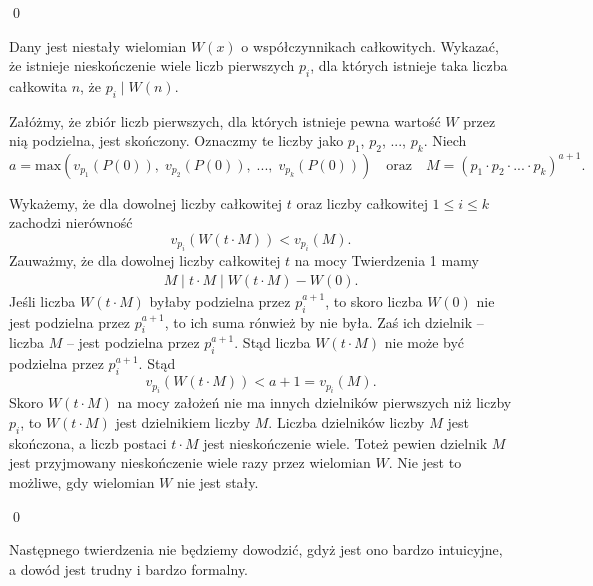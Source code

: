 \qed


\noindent
Dany jest niestały wielomian $W(x)$ o współczynnikach całkowitych. Wykazać, że istnieje nieskończenie wiele liczb pierwszych $p_i$, dla których istnieje taka liczba całkowita $n$, że $p_i \mid W(n)$.

\vspace{5px}


\noindent
Załóżmy, że zbiór liczb pierwszych, dla których istnieje pewna wartość $W$ przez nią podzielna, jest skończony. Oznaczmy te liczby jako $p_1$, $p_2$, ..., $p_k$.  Niech 
\[
	a = \text{max}(v_{p_1}(P(0)),\; v_{p_2}(P(0)),\; ...,\; v_{p_k}(P(0))) \quad \text{oraz} \quad M = (p_1 \cdot p_2 \cdot ... \cdot p_k)^{a + 1}.
\]

\vspace{10px}
\noindent
Wykażemy, że dla dowolnej liczby całkowitej $t$ oraz liczby całkowitej $1 \leqslant i \leqslant k$ zachodzi nierówność
\[
	v_{p_i}(W(t \cdot M)) < v_{p_i}(M).
\]
Zauważmy, że dla dowolnej liczby całkowitej $t$ na mocy Twierdzenia 1 mamy
\begin{align*}
	M \mid t \cdot M \mid W(t \cdot M) - W(0).
\end{align*}
Jeśli liczba $W(t \cdot M)$ byłaby podzielna przez $p_i^{a + 1}$, to skoro liczba $W(0)$ nie jest podzielna przez $p_i^{a + 1}$, to ich suma rónwież by nie była. Zaś ich dzielnik -- liczba $M$ -- jest podzielna przez $p_i^{a + 1}$. Stąd liczba $W(t \cdot M)$ nie może być podzielna przez $p_i^{a + 1}$. Stąd
\[
	v_{p_i}(W(t\cdot M)) < a + 1 = v_{p_i}(M).
\] 
Skoro $W(t\cdot M)$ na mocy założeń nie ma innych dzielników pierwszych niż liczby $p_i$, to $W(t\cdot M)$ jest dzielnikiem liczby $M$. Liczba dzielników liczby $M$ jest skończona, a liczb postaci $t\cdot M$ jest nieskończenie wiele. Toteż pewien dzielnik $M$ jest przyjmowany nieskończenie wiele razy przez wielomian $W$. Nie jest to możliwe, gdy wielomian $W$ nie jest stały.

\qed

\noindent
Następnego twierdzenia nie będziemy dowodzić, gdyż jest ono bardzo intuicyjne, a dowód jest trudny i bardzo formalny.

\vspace{5px}

